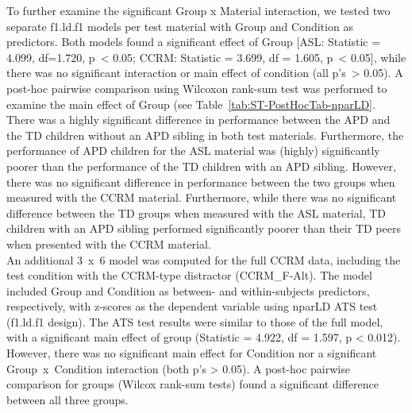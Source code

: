 \documentclass[a4paper, twoside]{templates/ociamthesis}
\begin{document}
To further examine the significant Group x Material interaction, we tested two separate f1.ld.f1 models per test material with Group and Condition as predictors. Both models found a significant effect of Group {[}ASL: Statistic = 4.099, df=1.720, p~\textless{} 0.05; CCRM: Statistic = 3.699, df = 1.605, p~\textless{} 0.05{]}, while there was no significant interaction or main effect of condition (all p's~\textgreater{} 0.05). A post-hoc pairwise comparison using Wilcoxon rank-sum test was performed to examine the main effect of Group (see Table~\ref{tab:ST-PostHocTab-nparLD}. There was a highly significant difference in performance between the APD and the TD children without an APD sibling in both test materials. Furthermore, the performance of APD children for the ASL material was (highly) significantly poorer than the performance of the TD children with an APD sibling. However, there was no significant difference in performance between the two groups when measured with the CCRM material. Furthermore, while there was no significant difference between the TD groups when measured with the ASL material, TD children with an APD sibling performed significantly poorer than their TD peers when presented with the CCRM material.\\

An additional 3~x~6 model was computed for the full CCRM data, including the test condition with the CCRM-type distractor (CCRM\_F-Alt). The model included Group and Condition as between- and within-subjects predictors, respectively, with z-scores as the dependent variable using nparLD ATS test (f1.ld.f1 design). The ATS test results were similar to those of the full model, with a significant main effect of group (Statistic = 4.922, df = 1.597, p \textless{} 0.012). However, there was no significant main effect for Condition nor a significant Group~x~Condition interaction (both p's \textgreater{} 0.05). A post-hoc pairwise comparison for groups (Wilcox rank-sum tests) found a significant difference between all three groups.
\end{document}
